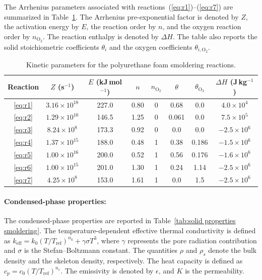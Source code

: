 \documentclass[12pt]{article}
\begin{document}
The Arrhenius parameters associated with reactions~(\ref{eq:r1})--(\ref{eq:r7}) are summarized in Table~\ref{tab:kinetics smoldering}. The Arrhenius pre-exponential factor is denoted by $Z$, the activation energy by $E$, the reaction order by $n$, and the oxygen reaction order by $n_{\mathrm{O_2}}$. The reaction enthalpy is denoted by $\Delta H$. The table also reports the solid stoichiometric coefficients $\theta_i$ and the oxygen coefficients $\theta_{i,\mathrm{O_2}}$.

\begin{table}[H]
\centering
\caption{Kinetic parameters for the polyurethane foam smoldering reactions.}
\label{tab:kinetics smoldering}
\begin{tabular}{c c c c c c c c}
\toprule
Reaction & $Z$ (s$^{-1}$) & $E$ (kJ\,mol$^{-1}$) & $n$ & $n_{\mathrm{O_2}}$ & $\theta$ & $\theta_{\mathrm{O_2}}$ & $\Delta H$ (J\,kg$^{-1}$) \\
\midrule
\eqref{eq:r1} & $3.16\times10^{18}$ & 227.0 & 0.80 & 0 & 0.68 & 0.0 & $4.0\times10^{4}$ \\
\eqref{eq:r2} & $1.29\times10^{10}$ & 146.5 & 1.25 & 0 & 0.061 & 0.0 & $7.5\times10^{5}$ \\
\eqref{eq:r3} & $8.24\times10^{8}$  & 173.3 & 0.92 & 0 & 0.0 & 0.0 & $-2.5\times10^{6}$ \\
\eqref{eq:r4} & $1.37\times10^{15}$ & 188.0 & 0.48 & 1 & 0.38 & 0.186 & $-1.5\times10^{6}$ \\
\eqref{eq:r5} & $1.00\times10^{16}$ & 200.0 & 0.52 & 1 & 0.56 & 0.176 & $-1.6\times10^{6}$ \\
\eqref{eq:r6} & $1.00\times10^{15}$ & 201.0 & 1.30 & 1 & 0.24 & 1.14 & $-2.5\times10^{6}$ \\
\eqref{eq:r7} & $4.25\times10^{8}$  & 153.0 & 1.61 & 1 & 0.0 & 1.5 & $-2.5\times10^{6}$ \\
\bottomrule
\end{tabular}
\end{table}

\paragraph{Condensed-phase properties:}

The condensed-phase properties are reported in Table~\ref{tab:solid properties smoldering}. The temperature-dependent effective thermal conductivity is defined as $k_{\mathrm{eff}} = k_0 (T/T_{\mathrm{ref}})^{n_k} + \gamma \sigma T^3$, where $\gamma$ represents the pore radiation contribution and $\sigma$ is the Stefan--Boltzmann constant. The quantities $\rho$ and $\rho_s$ denote the bulk density and the skeleton density, respectively. The heat capacity is defined as $c_p = c_0 (T/T_{\mathrm{ref}})^{n_c}$. The emissivity is denoted by $\epsilon$, and $K$ is the permeability.
\end{document}
